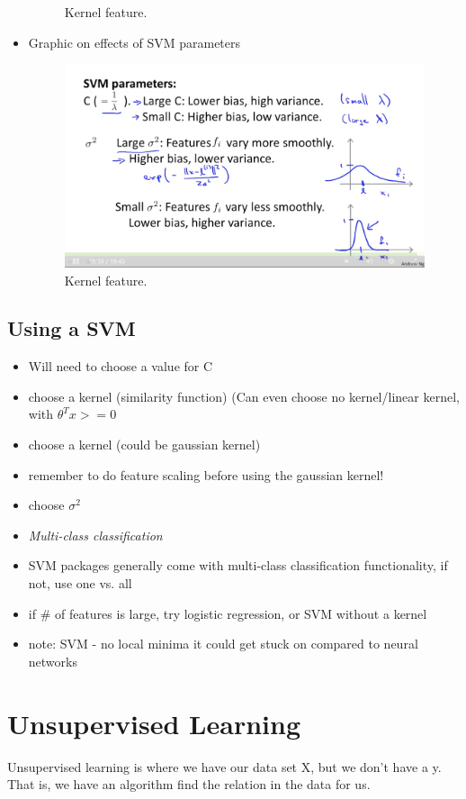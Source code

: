 \documentclass[]{article}
\begin{document}
\begin{itemize}
\begin{figure}[ht!]
				\caption{Kernel feature.}
			\end{figure}
			\item Graphic on effects of SVM parameters
			\begin{figure}[ht!]
				\includegraphics[width= 1.5\textwidth,center]{SVM_parameters.png}
				\caption{Kernel feature.}
			\end{figure}
		\end{itemize}
		
	\subsection{Using a SVM}
		\begin{itemize}
			\item Will need to choose a value for C
			\item choose a kernel (similarity function) (Can even choose no kernel/linear kernel, with $\theta^Tx>=0$
			\item choose a kernel (could be gaussian kernel)
			\item remember to do feature scaling before using the gaussian kernel!
			\item choose $\sigma^2$
			\item \emph{Multi-class classification}
			\item SVM packages generally come with multi-class classification functionality, if not, use one vs. all
			\item if \# of features is large, try logistic regression, or SVM without a kernel
			\item note: SVM - no local minima it could get stuck on compared to neural networks
		\end{itemize}

\section{Unsupervised Learning}
Unsupervised learning is where we have our data set X, but we don't have a y. That is, we have an algorithm find the relation in the data for us.
\end{document}
